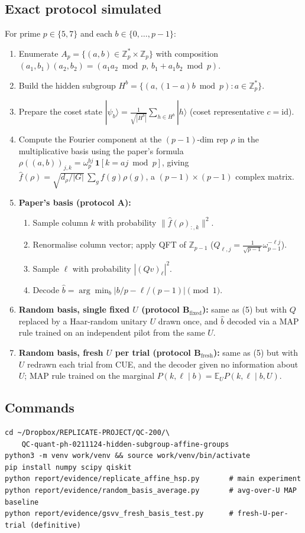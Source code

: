 \documentclass[11pt]{article}
\begin{document}
\subsection{Exact protocol simulated}
For prime $p\in\{5,7\}$ and each $b\in\{0,\dots,p-1\}$:
\begin{enumerate}
\item Enumerate $A_p=\{(a,b)\in\mathbb{Z}_p^{*}\times\mathbb{Z}_p\}$ with
composition $(a_1,b_1)(a_2,b_2)=(a_1a_2\bmod p,\, b_1+a_1 b_2\bmod p)$.
\item Build the hidden subgroup $H^b=\{(a,(1-a)b\bmod p) : a\in\mathbb{Z}_p^{*}\}$.
\item Prepare the coset state $|\psi_b\rangle
=\tfrac{1}{\sqrt{|H^b|}}\sum_{h\in H^b}|h\rangle$ (coset representative
$c=\mathrm{id}$).
\item Compute the Fourier component at the $(p-1)$-dim rep $\rho$ in the
multiplicative basis using the paper's formula
$\rho((a,b))_{j,k}=\omega_p^{bj}\,\mathbf{1}[k=aj\bmod p]$, giving
$\hat f(\rho)=\sqrt{d_\rho/|G|}\,\sum_g f(g)\rho(g)$, a $(p-1)\times(p-1)$
complex matrix.
\item \textbf{Paper's basis (protocol A):}
  \begin{enumerate}
    \item Sample column $k$ with probability $\|\hat f(\rho)_{:,k}\|^{2}$.
    \item Renormalise column vector; apply QFT of $\mathbb{Z}_{p-1}$
    ($Q_{\ell,j}=\tfrac{1}{\sqrt{p-1}}\omega_{p-1}^{-\ell j}$).
    \item Sample $\ell$ with probability $|(Q v)_\ell|^{2}$.
    \item Decode $\hat b=\arg\min_b |b/p-\ell/(p-1)|\pmod 1$.
  \end{enumerate}
\item \textbf{Random basis, single fixed $U$ (protocol B$_{\text{fixed}}$):}
same as (5) but with $Q$ replaced by a Haar-random unitary $U$ drawn once,
and $\hat b$ decoded via a MAP rule trained on an independent pilot from the
same $U$.
\item \textbf{Random basis, fresh $U$ per trial (protocol B$_{\text{fresh}}$):}
same as (5) but with $U$ redrawn each trial from CUE, and the decoder given
no information about $U$; MAP rule trained on the marginal
$P(k,\ell\mid b)=\mathbb{E}_U P(k,\ell\mid b,U)$.
\end{enumerate}

\subsection{Commands}
\begin{lstlisting}
cd ~/Dropbox/REPLICATE-PROJECT/QC-200/\
    QC-quant-ph-0211124-hidden-subgroup-affine-groups
python3 -m venv work/venv && source work/venv/bin/activate
pip install numpy scipy qiskit
python report/evidence/replicate_affine_hsp.py       # main experiment
python report/evidence/random_basis_average.py       # avg-over-U MAP baseline
python report/evidence/gsvv_fresh_basis_test.py      # fresh-U-per-trial (definitive)
\end{lstlisting}
\end{document}
